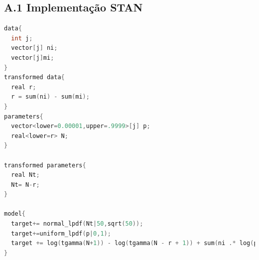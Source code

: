 \documentclass[a4paper,12pt,twoside]{article}
\begin{document}
\newpage
\subsection*{A.1 Implementação STAN}
\begin{lstlisting}[language=c]
data{
  int j;
  vector[j] ni;
  vector[j]mi;
}
transformed data{
  real r;  
  r = sum(ni) - sum(mi);
}
parameters{
  vector<lower=0.00001,upper=.9999>[j] p;
  real<lower=r> N;
}

transformed parameters{
  real Nt;
  Nt= N-r;
}

model{
  target+= normal_lpdf(Nt|50,sqrt(50));
  target+=uniform_lpdf(p|0,1);
  target += log(tgamma(N+1)) - log(tgamma(N - r + 1)) + sum(ni .* log(p)  + (N-ni).*log(1-p));
}

\end{lstlisting}
\end{document}
